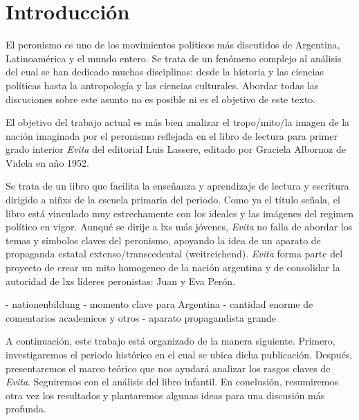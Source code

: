 \section{Introducción}
El peronismo es uno de los movimientos políticos más discutidos de Argentina, Latinoamérica y el mundo entero.
Se trata de un fenómeno complejo al análisis del cual se han dedicado muchas disciplinas: desde la historia y las ciencias políticas hasta la antropología y las ciencias culturales.
Abordar todas las discuciones sobre este asunto no es posible ni es el objetivo de este texto.

El objetivo del trabajo actual es más bien analizar el tropo/mito/la imagen de la nación imaginada por el peronismo reflejada en el libro de lectura para primer grado interior \textit{Evita} del editorial Luis Lassere, editado por Graciela Albornoz de Videla en año 1952.

Se trata de un libro que facilita la enseñanza y aprendizaje de lectura y escritura dirigido a niñxs de la escuela primaria del periodo.
Como ya el título señala, el libro está vinculado muy estrechamente con los ideales y las imágenes del regimen político en vigor.
Aunqué se dirije a lxs más jóvenes, \textit{Evita} no falla de abordar los temas y símbolos claves del peronismo, apoyando la idea de un aparato de propaganda estatal extenso/transcedental (weitreichend).
\textit{Evita} forma parte del proyecto de crear un mito homogeneo de la nación argentina
y de consolidar la autoridad de lxs líderes peronistas: Juan y Eva Perón.


- nationenbildung
- momento clave para Argentina
- cantidad enorme de comentarios academicos y otros
- aparato propagandista grande


A continuación, este trabajo está organizado de la manera siguiente.
Primero, investigaremos el periodo histórico en el cual se ubica dicha publicación.
Después, presentaremos el marco teórico que nos ayudará analizar los rasgos claves de \textit{Evita}.
Seguiremos con el análisis del libro infantil.
En conclusión, resumiremos otra vez los resultados y plantaremos algunas ideas para una discusión más profunda.
